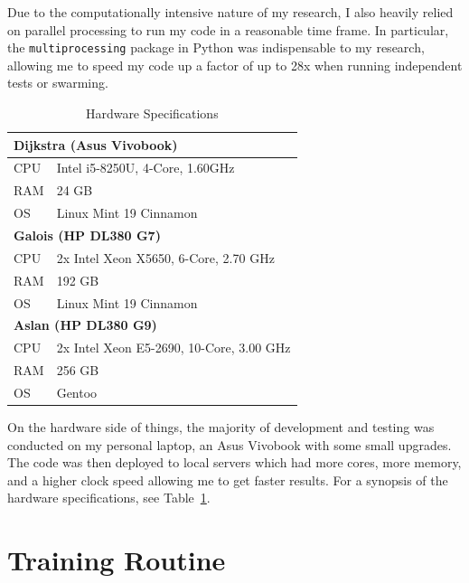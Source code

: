 \documentclass[oneside,12pt,openany]{book}
\begin{document}
	Due to the computationally intensive nature of my research, I also heavily relied on parallel processing to run my code in a reasonable time frame. In particular, the \texttt{multiprocessing} package in Python was indispensable to my research, allowing me to speed my code up a factor of up to 28x when running independent tests or swarming.
	
	\begin{table}[hbt!]
		\centering
		\begin{tabular}{|l|l|}
			\hline
			\multicolumn{2}{|l|}{\textbf{Dijkstra (Asus Vivobook)}} \\ \hline
			CPU     & Intel i5-8250U, 4-Core, 1.60GHz     \\ \hline
			RAM     & 24 GB                                \\ \hline
			OS      & Linux Mint 19 Cinnamon               \\ \hline
			\multicolumn{2}{|l|}{\textbf{Galois (HP DL380 G7)}}     \\ \hline
			CPU     &  2x Intel Xeon X5650, 6-Core, 2.70 GHz       \\ \hline
			RAM     & 192 GB                               \\ \hline
			OS      & Linux Mint 19 Cinnamon               \\ \hline
			\multicolumn{2}{|l|}{\textbf{Aslan (HP DL380 G9)}}                         \\ \hline
			CPU&    2x  Intel Xeon E5-2690, 10-Core, 3.00 GHz    \\ \hline
			RAM&    256 GB                                  \\ \hline
			OS&    Gentoo                               \\ \hline
		\end{tabular}
		\caption{Hardware Specifications}
		\label{tab:hardware}
	\end{table}

	On the hardware side of things, the majority of development and testing was conducted on my personal laptop, an Asus Vivobook with some small upgrades. The code was then deployed to local servers which had more cores, more memory, and a higher clock speed allowing me to get faster results. For a synopsis of the hardware specifications, see Table~\ref{tab:hardware}. 
	
	\section{Training Routine}\label{sec:exp:train}
	
\end{document}
